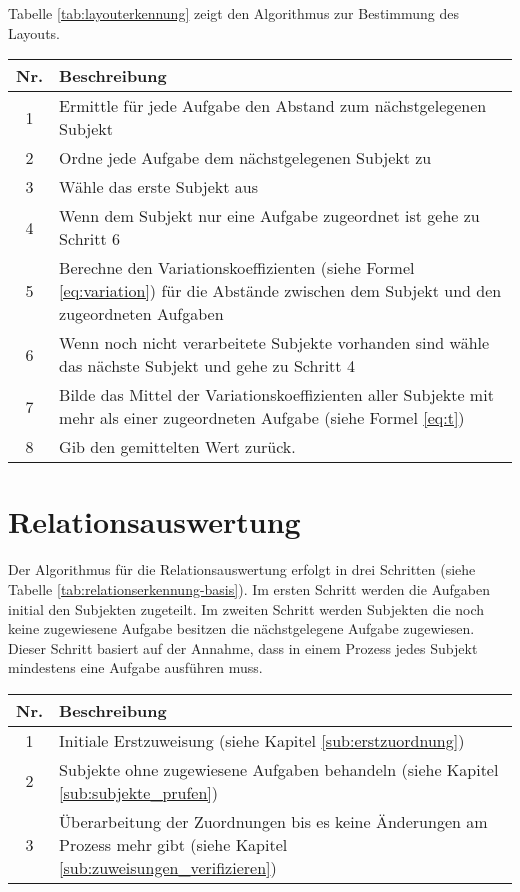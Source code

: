 Tabelle \ref{tab:layouterkennung} zeigt den Algorithmus zur Bestimmung des Layouts.
\begin{center}
	\label{tab:layouterkennung}
	\begin{tabularx}
		{1.0\linewidth}{ c X } \textbf{Nr.} & \textbf{Beschreibung} \\
		\hline 1 & Ermittle für jede Aufgabe den Abstand zum nächstgelegenen Subjekt \\
		\hline 2 & Ordne jede Aufgabe dem nächstgelegenen Subjekt zu \\
		\hline 3 & Wähle das erste Subjekt aus \\
		\hline 4 & Wenn dem Subjekt nur eine Aufgabe zugeordnet ist gehe zu Schritt 6 \\
		\hline 5 & Berechne den Variationskoeffizienten (siehe Formel  \ref{eq:variation}) für die Abstände zwischen dem Subjekt und den zugeordneten Aufgaben \\
		\hline 6 & Wenn noch nicht verarbeitete Subjekte vorhanden sind wähle das nächste Subjekt und gehe zu Schritt 4 \\
		\hline 7 & Bilde das Mittel der Variationskoeffizienten aller Subjekte mit mehr als einer zugeordneten Aufgabe (siehe Formel \ref{eq:t})\\
		\hline 8 & Gib den gemittelten Wert zurück.
	\end{tabularx}
\end{center}

\section{Relationsauswertung} %
\label{sub:relationsauswertung}
Der Algorithmus für die Relationsauswertung erfolgt in drei Schritten (siehe Tabelle \ref{tab:relationserkennung-basis}). Im ersten Schritt werden die Aufgaben initial den Subjekten zugeteilt. Im zweiten Schritt werden Subjekten die noch keine zugewiesene Aufgabe besitzen die nächstgelegene Aufgabe zugewiesen. Dieser Schritt basiert auf der Annahme, dass in einem Prozess jedes Subjekt mindestens eine Aufgabe ausführen muss.

\begin{center}
	\label{tab:relationserkennung-basis}
	\begin{tabularx}
		{1.0\linewidth}{ c X } \textbf{Nr.} & \textbf{Beschreibung} \\
		\hline 1 & Initiale Erstzuweisung (siehe Kapitel \ref{sub:erstzuordnung}) \\
		\hline 2 & Subjekte ohne zugewiesene Aufgaben behandeln (siehe Kapitel \ref{sub:subjekte_prufen}) \\
		\hline 3 & Überarbeitung der Zuordnungen bis es keine Änderungen am Prozess mehr gibt (siehe Kapitel \ref{sub:zuweisungen_verifizieren})\\
	\end{tabularx}
\end{center}

